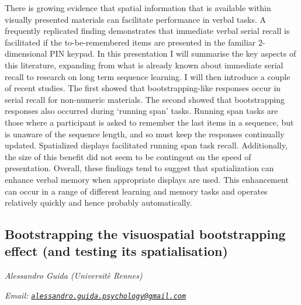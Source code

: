 \documentclass[
  12pt,
]{book}
\begin{document}
There is growing evidence that spatial information that is available within visually presented materials can facilitate performance in verbal tasks. A frequently replicated finding demonstrates that immediate verbal serial recall is facilitated if the to-be-remembered items are presented in the familiar 2-dimensional PIN keypad. In this presentation I will summarise the key aspects of this literature, expanding from what is already known about immediate serial recall to research on long term sequence learning. I will then introduce a couple of recent studies. The first showed that bootstrapping-like responses occur in serial recall for non-numeric materials. The second showed that bootstrapping responses also occurred during `running span' tasks. Running span tasks are those where a participant is asked to remember the last items in a sequence, but is unaware of the sequence length, and so must keep the responses continually updated. Spatialized displays facilitated running span task recall. Additionally, the size of this benefit did not seem to be contingent on the speed of presentation. Overall, these findings tend to suggest that spatialization can enhance verbal memory when appropriate displays are used. This enhancement can occur in a range of different learning and memory tasks and operates relatively quickly and hence probably automatically.

\hypertarget{bootstrapping-the-visuospatial-bootstrapping-effect-and-testing-its-spatialisation}{%
\subsection{Bootstrapping the visuospatial bootstrapping effect (and testing its spatialisation)}\label{bootstrapping-the-visuospatial-bootstrapping-effect-and-testing-its-spatialisation}}

\emph{Alessandro Guida (Universitè Rennes)}

\emph{Email: \href{mailto:alessandro.guida.psychology@gmail.com}{\nolinkurl{alessandro.guida.psychology@gmail.com}}}
\end{document}
